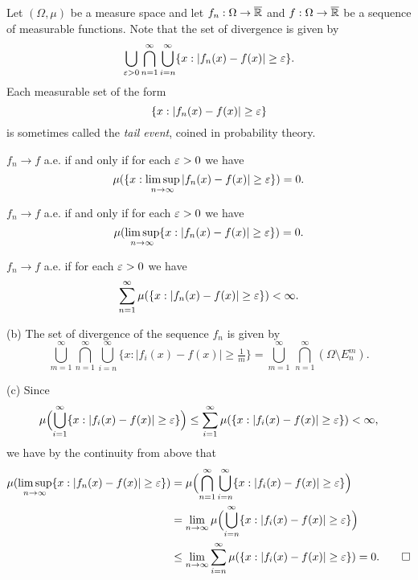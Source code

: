 \documentclass{../../large}
\begin{document}
\begin{prb}
Let $(\Omega,\mu)$ be a measure space and let $f_n:\Omega\to\overline{\mathbb{R}}$ and $f:\Omega\to\overline{\mathbb{R}}$ be a sequence of measurable functions.
Note that the set of divergence is given by
\[\bigcup_{\varepsilon>0}\bigcap_{n=1}^\infty\bigcup_{i=n}^\infty\{x:|f_n(x)-f(x)|\ge\varepsilon\}.\]
Each measurable set of the form
\[\{x:|f_n(x)-f(x)|\ge\varepsilon\}\]
is sometimes called the \emph{tail event}, coined in probability theory.
\begin{parts}
\item $f_n\to f$ a.e. if and only if for each $\varepsilon>0$ we have
\[\mu(\{x:\limsup_{n\to\infty}|f_n(x)-f(x)|\ge\varepsilon\})=0.\]
\item $f_n\to f$ a.e. if and only if for each $\varepsilon>0$ we have
\[\mu(\limsup_{n\to\infty}\{x:|f_n(x)-f(x)|\ge\varepsilon\})=0.\]
\item $f_n\to f$ a.e. if for each $\varepsilon>0$ we have
\[\sum_{n=1}^\infty\mu(\{x:|f_n(x)-f(x)|\ge\varepsilon\})<\infty.\]
\end{parts}
\end{prb}
\begin{pf}
(b)
The set of divergence of the sequence $f_n$ is given by
\[\bigcup_{m=1}^\infty\bigcap_{n=1}^\infty\bigcup_{i=n}^\infty\{x:|f_i(x)-f(x)|\ge\tfrac1m\}=\bigcup_{m=1}^\infty\,\bigcap_{n=1}^\infty(\Omega\setminus E_n^m).\]

(c)
Since
\[\mu\Bigl(\bigcup_{i=1}^\infty\{x:|f_i(x)-f(x)|\ge\varepsilon\}\Bigr)\le\sum_{i=1}^\infty\mu(\{x:|f_i(x)-f(x)|\ge\varepsilon\})<\infty,\]
we have by the continuity from above that
\begin{align*}
\mu(\limsup_{n\to\infty}\{x:|f_n(x)-f(x)|\ge\varepsilon\})
&=\mu\Bigl(\bigcap_{n=1}^\infty\bigcup_{i=n}^\infty\{x:|f_i(x)-f(x)|\ge\varepsilon\}\Bigr)\\
&=\lim_{n\to\infty}\mu\Bigl(\bigcup_{i=n}^\infty\{x:|f_i(x)-f(x)|\ge\varepsilon\}\Bigr)\\
&\le\lim_{n\to\infty}\sum_{i=n}^\infty\mu(\{x:|f_i(x)-f(x)|\ge\varepsilon\})
=0.\qedhere
\end{align*}
\end{pf}
\end{document}
